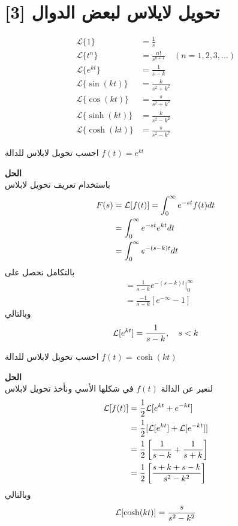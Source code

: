 \section{تحويل لايلاس لبعض الدوال [3]}
\begin{align}
	\mathcal{L}\{1\}         &= \frac{1}{s}      \\
	\mathcal{L}\{t^n\}       &= \frac{n!}{s^{n+1}}   \quad (n = 1, 2, 3, \dots) \\
	\mathcal{L}\{e^{kt}\}    &= \frac{1}{s-k}        \\
	\mathcal{L}\{\sin(kt)\}  &= \frac{k}{s^2+k^2} \\
	\mathcal{L}\{\cos(kt)\} &= \frac{s}{s^2+k^2}   \\
	\mathcal{L}\{\sinh(kt)\} &= \frac{k}{s^2-k^2}   \\
	\mathcal{L}\{\cosh(kt)\} &= \frac{s}{s^2-k^2}    \
\end{align}

\begin{example}
	احسب تحويل لابلاس للدالة $f(t) = e^{kt}$
\end{example}
\noindent
\textbf{الحل}\\
\noindent
باستخدام تعريف تحويل لابلاس
\begin{align*}
	F(s) &= \mathcal{L}[f(t)] = \int_{0}^{\infty} e^{-st} f(t) dt\\
	&= \int_{0}^{\infty} e^{-st} e^{kt} dt\\
	&= \int_{0}^{\infty} e^{-(s-k)t}dt
\end{align*}
بالتكامل نحصل على
\begin{align*}
	&= \frac{1}{s-k} e^{-(s-k)t}\Big|^\infty_0\\
	&= \frac{-1}{s-k} [e^{-\infty} -1]
\end{align*}
وبالتالي
\[
\mathcal{L}[e^{kt}] = \frac{1}{s-k}, \quad s < k
\]

\begin{example}
	احسب تحويل لابلاس للدالة $f(t) = \cosh(kt)$
\end{example}
\noindent
\textbf{الحل}\\
\noindent
لنعبر عن الدالة $f(t)$ في شكلها الأسي ونأخذ تحويل لابلاس
\begin{align*}
	\mathcal{L}[f(t)] &= \frac{1}{2}\mathcal{L}[e^{kt} + e^{-kt}]\\
	&= \frac{1}{2} [\mathcal{L}[e^{kt}] + \mathcal{L}[e^{-kt}]]\\
	&= \frac{1}{2} \left[\frac{1}{s-k} + \frac{1}{s+k}\right]\\
	&= \frac{1}{2}\left[\frac{s+k+s-k}{s^2-k^2}\right]
\end{align*}
وبالتالي
\[
\mathcal{L}[\cosh(kt)] = \frac{s}{s^2-k^2}
\]


